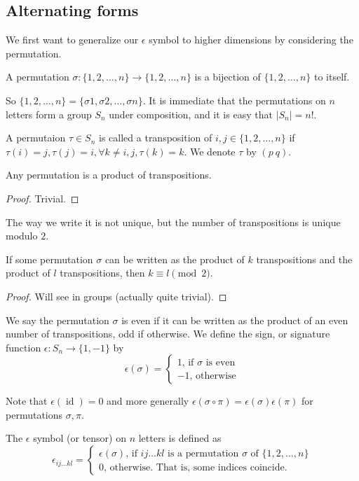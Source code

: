 \subsection{Alternating forms}
We first want to generalize our $\epsilon$ symbol to higher dimensions by considering the permutation.
\begin{definition}
    A permutation $\sigma:\{1,2,\ldots,n\}\to\{1,2,\ldots,n\}$ is a bijection of $\{1,2,\ldots,n\}$ to itself.
\end{definition}
So $\{1,2,\ldots,n\}=\{\sigma{1},\sigma{2},\ldots,\sigma{n}\}$.
It is immediate that the permutations on $n$ letters form a group $S_n$ under composition, and it is easy that $|S_n|=n!$.
\begin{definition}
    A permutaion $\tau\in S_n$ is called a transposition of $i,j\in\{1,2,\ldots,n\}$ if $\tau(i)=j,\tau(j)=i,\forall k\neq i,j, \tau(k)=k$.
    We denote $\tau$ by $(p\ q)$.
\end{definition}
\begin{proposition}
    Any permutation is a product of transpositions.
\end{proposition}
\begin{proof}
    Trivial.
\end{proof}
The way we write it is not unique, but the number of transpositions is unique modulo $2$.
\begin{proposition}
    If some permutation $\sigma$ can be written as the product of $k$ transpositions and the product of $l$ transpositions, then $k\equiv l\pmod{2}$.
\end{proposition}
\begin{proof}
    Will see in groups (actually quite trivial).
\end{proof}
\begin{definition}
    We say the permutation $\sigma$ is even if it can be written as the product of an even number of transpositions, odd if otherwise.
    We define the sign, or signature function $\epsilon:S_n\to\{1,-1\}$ by
    $$\epsilon(\sigma)=
    \begin{cases}
        1\text{, if $\sigma$ is even}\\
        -1\text{, otherwise}
    \end{cases}
    $$
\end{definition}
Note that $\epsilon(\operatorname{id})=0$ and more generally $\epsilon(\sigma\circ\pi)=\epsilon(\sigma)\epsilon(\pi)$ for permutations $\sigma,\pi$.
\begin{definition}
    The $\epsilon$ symbol (or tensor) on $n$ letters is defined as
    $$
    \epsilon_{ij\ldots kl}=
    \begin{cases}
        \epsilon(\sigma)\text{, if $ij\ldots kl$ is a permutation $\sigma$ of $\{1,2,\ldots,n\}$}\\
        0\text{, otherwise. That is, some indices coincide.}
    \end{cases}
    $$
\end{definition}
